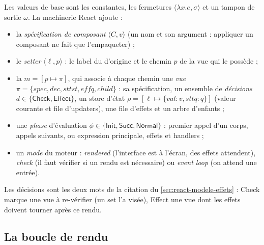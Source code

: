 Les valeurs de base sont les constantes, les fermetures
$\langle \lambda x.e, \sigma\rangle$ et un tampon de sortie $\omega$. La
machinerie React ajoute :
\begin{itemize}
  \item la \emph{spécification de composant} $\langle C, v\rangle$ (un nom et
    son argument : appliquer un composant ne fait que l'empaqueter) ;
  \item le \emph{setter} $\langle \ell, p\rangle$ : le label du 
    d'origine et le chemin $p$ de la vue qui le possède ;
  \item la  $m = [p \mapsto \pi]$, qui associe à chaque
    chemin une \emph{vue}
    $\pi = \{\mathit{spec}, \mathit{dec}, \mathit{sttst}, \mathit{effq}, \mathit{child}\}$ :
    sa spécification, un ensemble de \emph{décisions}
    $d \in \{\mathsf{Check}, \mathsf{Effect}\}$, un store d'état
    $\rho = [\ell \mapsto \{\mathit{val} : v, \mathit{sttq} : q\}]$ (valeur
    courante et file d'updaters), une file d'effets et un arbre d'enfants ;
  \item une \emph{phase} d'évaluation $\phi \in \{\mathsf{Init}, \mathsf{Succ},
    \mathsf{Normal}\}$ : premier appel d'un corps, appels suivants, ou
    expression principale, effets et handlers ;
  \item un \emph{mode} du moteur : \emph{rendered} (l'interface est à l'écran,
    des effets attendent), \emph{check} (il faut vérifier si un rendu est
    nécessaire) ou \emph{event loop} (on attend une entrée).
\end{itemize}
Les décisions sont les deux mots de la citation du
\cref{sec:react-modele-effets} : \textsf{Check} marque une vue à re-vérifier
(un set l'a visée), \textsf{Effect} une vue dont les effets doivent tourner
après ce rendu.

\subsection{La boucle de rendu}

